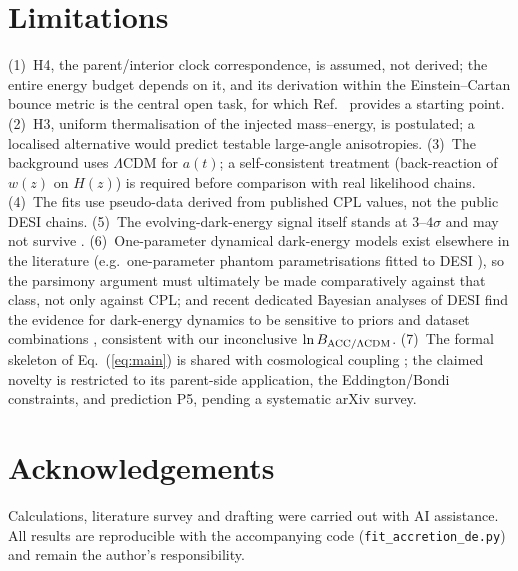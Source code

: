 \documentclass[11pt]{article}
\begin{document}
\section{Limitations}
\label{sec:limits}
(1)~H4, the parent/interior clock correspondence, is assumed, not derived; the entire energy budget depends on it, and its derivation within the Einstein--Cartan bounce metric is the central open task, for which Ref.~\cite{Poplawski2024} provides a starting point. (2)~H3, uniform thermalisation of the injected mass--energy, is postulated; a localised alternative would predict testable large-angle anisotropies. (3)~The background uses $\Lambda$CDM for $a(t)$; a self-consistent treatment (back-reaction of $w(z)$ on $H(z)$) is required before comparison with real likelihood chains. (4)~The fits use pseudo-data derived from published CPL values, not the public DESI chains. (5)~The evolving-dark-energy signal itself stands at $3$--$4\sigma$ and may not survive \cite{DESI2025}. (6)~One-parameter dynamical dark-energy models exist elsewhere in the literature (e.g.\ one-parameter phantom parametrisations fitted to DESI \cite{Fikri2024}), so the parsimony argument must ultimately be made comparatively against that class, not only against CPL; and recent dedicated Bayesian analyses of DESI find the evidence for dark-energy dynamics to be sensitive to priors and dataset combinations \cite{Ong2025}, consistent with our inconclusive $\ln B_{\rm ACC/\Lambda CDM}$. (7)~The formal skeleton of Eq.~(\ref{eq:main}) is shared with cosmological coupling \cite{CrokerWeiner2019}; the claimed novelty is restricted to its parent-side application, the Eddington/Bondi constraints, and prediction P5, pending a systematic arXiv survey.

\section*{Acknowledgements}
Calculations, literature survey and drafting were carried out with AI assistance. All results are reproducible with the accompanying code (\texttt{fit\_accretion\_de.py}) and remain the author's responsibility.
\end{document}
